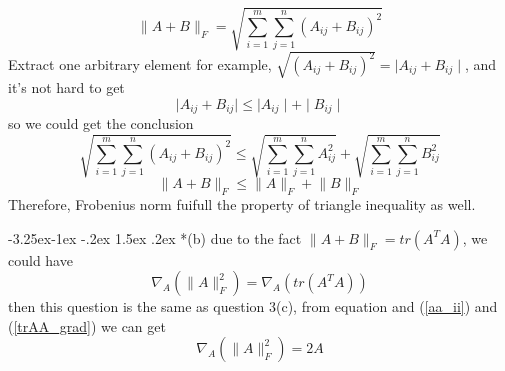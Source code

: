\documentclass[12pt]{article}
\makeatletter
\renewcommand\subsection{\@startsection{subsection}{2}{\z@}%
	{-3.25ex\@plus -1ex \@minus -.2ex}%
	{1.5ex \@plus .2ex}%
	{\normalfont\large\bfseries}}%
\makeatother
\begin{document}
\begin{equation}\label{ab_frob_norm}
	\lVert A+B\rVert_F=\sqrt{\sum_{i=1}^m\sum_{j=1}^n(A_{ij}+B_{ij})^2}
\end{equation}
Extract one arbitrary element for example, $\sqrt{(A_{ij}+B_{ij})^2}=\mid A_{ij}+B_{ij}\mid$, and it's not hard to get 
\begin{equation}\label{equa}
	\mid A_{ij}+B_{ij}\mid \le \mid A_{ij}\mid +\mid B_{ij}\mid
\end{equation}
so we could get the conclusion 
\begin{equation}\label{equa2}
	\sqrt{\sum_{i=1}^m\sum_{j=1}^n(A_{ij}+B_{ij})^2} \le \sqrt{\sum_{i=1}^m\sum_{j=1}^n A_{ij}^2} + \sqrt{\sum_{i=1}^m\sum_{j=1}^n B_{ij}^2}
\end{equation}
\begin{equation}\label{equa_final}
	\lVert A+B\rVert_F\le \lVert A\rVert_F+\lVert B\rVert_F
\end{equation}
Therefore, Frobenius norm fuifull the property of triangle inequality as well.

\subsection*{(b)}
due to the fact $\lVert A+B\rVert_F=tr(A^TA)$, we could have
\begin{equation}\label{trAA_from}
	\nabla_A(\lVert A\rVert_F^2)=\nabla_A(tr(A^TA))
\end{equation}
then this question is the same as question 3(c), from equation and (\ref{aa_ii}) and (\ref{trAA_grad})
we can get
\begin{equation}\label{trAA_from}
	\nabla_A(\lVert A\rVert_F^2)=2A
\end{equation}
	



 
\end{document}
